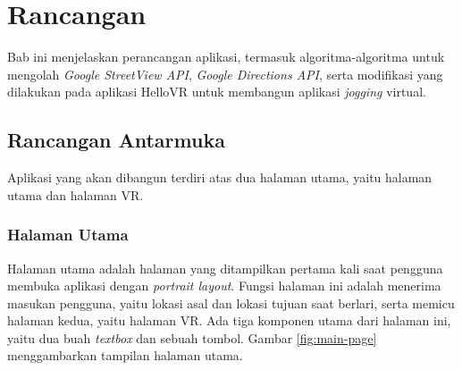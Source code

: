 \chapter{Rancangan}
\label{chap:rancangan}
Bab ini menjelaskan perancangan aplikasi, termasuk algoritma-algoritma untuk mengolah \textit{Google StreetView API}, \textit{Google Directions API}, serta modifikasi yang dilakukan pada aplikasi HelloVR untuk membangun aplikasi \textit{jogging} virtual. 


\section{Rancangan Antarmuka}
Aplikasi yang akan dibangun terdiri atas dua halaman utama, yaitu halaman utama dan halaman VR.

\subsection{Halaman Utama}
\label{subs:main-page}
Halaman utama adalah halaman yang ditampilkan pertama kali saat pengguna membuka aplikasi dengan \textit{portrait layout}. Fungsi halaman ini adalah menerima masukan pengguna, yaitu lokasi asal dan lokasi tujuan saat berlari, serta memicu halaman kedua, yaitu halaman VR. Ada tiga komponen utama dari halaman ini, yaitu dua buah \textit{textbox} dan sebuah tombol. Gambar \ref{fig:main-page} menggambarkan tampilan halaman utama.  

